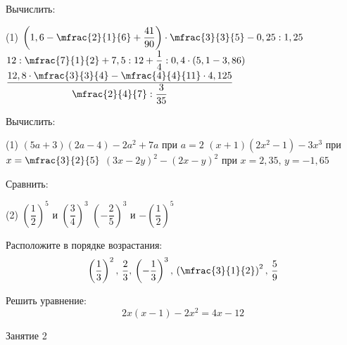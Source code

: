 %
%
%
\begin{class}[number=1]
	\begin{listofex}
		\item Вычислить:
		\begin{tasks}(1)
			\task \( \left( 1,6-\mfrac{2}{1}{6}+\dfrac{41}{90} \right)\cdot\mfrac{3}{3}{5}-0,25:1,25 \)
			\task \( 12:\mfrac{7}{1}{2}+7,5:12+\dfrac{1}{4}:0,4\cdot(5,1-3,86) \)
			\task \( \dfrac{12,8\cdot\mfrac{3}{3}{4}-\mfrac{4}{4}{11}\cdot4,125}{\mfrac{2}{4}{7}:\dfrac{3}{35}} \)
		\end{tasks}
		\item Вычислить:
		\begin{tasks}(1)
			\task \( (5a+3)(2a-4)-2a^2+7a \) при \( a=2 \)
			\task \( (x+1)(2x^2-1)-3x^3 \) при \( x=\mfrac{3}{2}{5} \)
			\task \( (3x-2y)^2-(2x-y)^2 \) при \( x=2,35,\,y=-1,65 \)
		\end{tasks}
		\item Сравнить:
		\begin{tasks}(2)
			\task \( \left( \dfrac{1}{2} \right)^5 \) и \( \left( \dfrac{3}{4} \right)^3 \)
			\task \( \left( -\dfrac{2}{5} \right)^3 \) и \( -\left( \dfrac{1}{2} \right)^5 \)
		\end{tasks}
		\item Расположите в порядке возрастания:
		\[ \left( \dfrac{1}{3} \right)^2,\,\dfrac{2}{3},\,\left( -\dfrac{1}{3} \right)^3,\,\left( \mfrac{3}{1}{2} \right)^2,\,\dfrac{5}{9} \]
		\item Решить уравнение:
		\[ 2x(x-1)-2x^2=4x-12 \]
	\end{listofex}
\end{class}

\begin{class}[number=2]
	\begin{listofex}
		\item Занятие 2
	\end{listofex}
\end{class}


